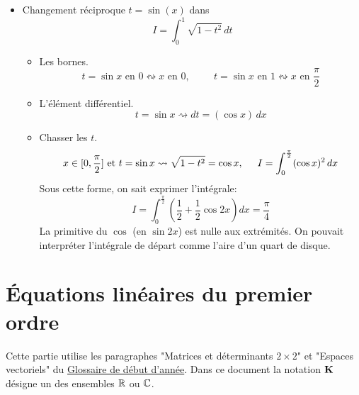 \begin{itemize}
\item Changement réciproque $t=\sin(x)$ dans 
\begin{displaymath}
 I = \int_{0}^{1}\sqrt{1-t^2}\,dt
\end{displaymath}
\begin{itemize}
  \item Les bornes.
\begin{displaymath}
  t=\sin x \text{ en } 0 \leftrightsquigarrow x \text{ en } 0,\hspace{1cm}
  t=\sin x \text{ en } 1 \leftrightsquigarrow x \text{ en } \frac{\pi}{2}
\end{displaymath}
  \item L'élément différentiel.
\begin{displaymath}
  t = \sin x \rightsquigarrow dt = (\cos x )\,dx
\end{displaymath}
  \item Chasser les $t$.
\begin{displaymath}
  x\in [0,\frac{\pi}{2}]\text{ et } t=\sin x \rightsquigarrow \sqrt{1-t^2} = \cos x,\hspace{0.5cm}
  I = \int_{0}^{\frac{\pi}{2}}(\cos x)^2\, dx
\end{displaymath}
Sous cette forme, on sait exprimer l'intégrale:
\begin{displaymath}
  I = \int_0^{\frac{\pi}{2}}\left( \frac{1}{2} + \frac{1}{2}\cos 2x\right) dx = \frac{\pi}{4}
\end{displaymath}
La primitive du $\cos$ (en $\sin 2x$) est nulle aux extrémités. On pouvait interpréter l'intégrale de départ comme l'aire d'un quart de disque.
\end{itemize}

\end{itemize}

\section{\'Equations linéaires du premier ordre}
Cette partie utilise les paragraphes "Matrices et déterminants $2\times2$" et "Espaces vectoriels" du \href{\baseurl C4199.pdf}{Glossaire de début d'année}. Dans ce document la notation $\mathbf{K}$ désigne un des ensembles $\mathbb{R}$ ou $\mathbb{C}$.
